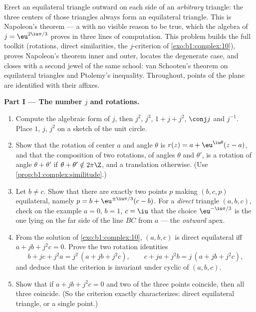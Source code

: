 \begin{problem}\label{pb:b1:complex:1}
Erect an equilateral triangle outward on each side of an
\emph{arbitrary} triangle: the three centers of those triangles
always form an equilateral triangle. This is Napoleon's theorem
 --- a  with no visible reason to
be true, which the algebra of $j = \eu^{2\iu\pi/3}$ proves in three
lines of computation. This problem builds the full toolkit
(rotations, direct similarities, the $j$-criterion of
\cref{exo:b1:complex:10}), proves Napoleon's theorem inner and
outer, locates the degenerate case, and closes with a second jewel
of the same school: van Schooten's theorem on equilateral triangles
and Ptolemy's inequality. Throughout, points of the plane are
identified with their affixes.

\medskip
\noindent\textbf{Part I --- The number $j$ and rotations.}
\begin{enumerate}
  \item Compute the algebraic form of $j$, then $j^2$, $j^3$, $1 + j
        + j^2$, $\conj j$ and $j^{-1}$. Place $1$, $j$, $j^2$ on a
        sketch of the unit circle.
  \item Show that the rotation of center $a$ and angle $\theta$ is
        $r(z) = a + \eu^{\iu\theta}(z - a)$, and that the
        composition of two rotations, of angles $\theta$ and
        $\theta'$, is a rotation of angle $\theta + \theta'$ if
        $\theta + \theta' \notin 2\pi\Z$, and a translation
        otherwise. (Use \cref{prop:b1:complex:similitude}.)
  \item Let $b \neq c$. Show that there are exactly two points $p$
        making $(b, c, p)$ equilateral, namely $p = b +
        \eu^{\pm\iu\pi/3}(c - b)$. For a \emph{direct} triangle
        $(a, b, c)$, check on the example $a = 0$, $b = 1$, $c =
        \iu$ that the choice $\eu^{-\iu\pi/3}$ is the one lying on
        the far side of the line $BC$ from $a$ --- the
        \emph{outward} apex.
  \item From the solution of \cref{exo:b1:complex:10}, $(a, b, c)$
        is direct equilateral iff $a + jb + j^2c = 0$. Prove the two
        rotation identities
        \[
        b + jc + j^2a = j^2\,(a + jb + j^2c),
        \qquad
        c + ja + j^2b = j\,(a + jb + j^2c),
        \]
        and deduce that the criterion is invariant under cyclic
         of $(a, b, c)$.
  \item Show that if $a + jb + j^2c = 0$ and two of the three points
        coincide, then all three coincide. (So the criterion exactly
        characterizes: direct equilateral triangle, or a single
        point.)
\end{enumerate}


\end{problem}
